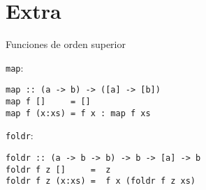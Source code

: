 \appendix
\section{Extra}

\begin{frame}[fragile]{Funciones de orden superior}
\hypertarget{definiciones}{}

\texttt{map}:
\begin{lstlisting}
map :: (a -> b) -> ([a] -> [b])
map f []     = []
map f (x:xs) = f x : map f xs
\end{lstlisting}
\espacio

\texttt{foldr}:
\begin{lstlisting}
foldr :: (a -> b -> b) -> b -> [a] -> b
foldr f z []     =  z
foldr f z (x:xs) =  f x (foldr f z xs)
\end{lstlisting}

\hfill\hyperlink{funcionesOrdenSup}{}
\end{frame}
